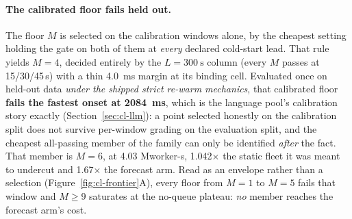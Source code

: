 \paragraph{The calibrated floor fails held out.} The floor $M$ is selected on
the calibration windows alone, by the cheapest setting holding the gate on
both of them at \emph{every} declared cold-start lead. That rule yields
$M{=}4$, decided entirely by the $L{=}\SI{300}{\second}$ column (every $M$
passes at 15/30/45\,s) with a thin \SI{4.0}{\milli\second} margin at its
binding cell. Evaluated once on held-out data \emph{under the shipped strict
re-warm mechanics}, that calibrated floor
\textbf{fails the fastest onset at \SI{2084}{\milli\second}}, which is the
language pool's calibration story exactly (Section~\ref{sec:cl-llm}): a point
selected honestly on the calibration split does not survive per-window grading
on the evaluation split, and the cheapest all-passing member of the family can
only be identified \emph{after} the fact. That member is $M{=}6$, at 4.03
Mworker-s, 1.042$\times$ the static fleet it was meant to undercut and
1.67$\times$ the forecast arm. Read as an envelope rather than a selection
(Figure~\ref{fig:cl-frontier}A), every floor from $M{=}1$ to $M{=}5$ fails
that window and $M{\geq}9$
saturates at the no-queue plateau: \emph{no} member reaches the forecast arm's
cost.

